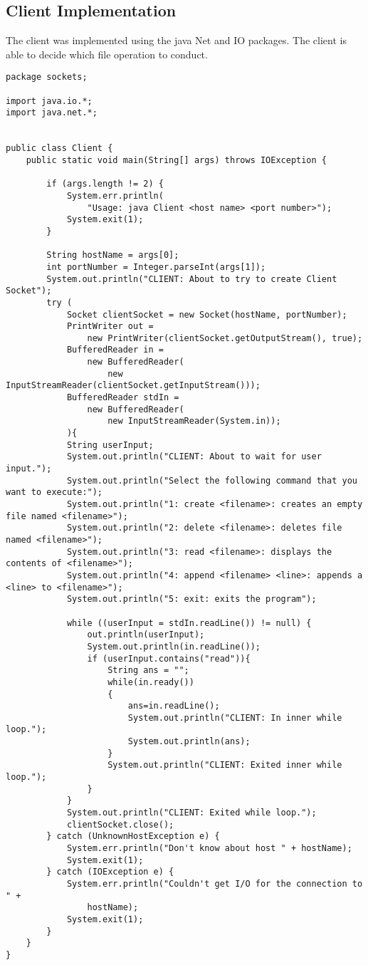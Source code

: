 \documentclass{article}
\begin{document}
	\subsection{Client Implementation}
	The client was implemented using the java Net and IO packages. The client is able to decide which file operation to conduct.
		\begin{lstlisting}
package sockets;

import java.io.*;
import java.net.*;


public class Client {
	public static void main(String[] args) throws IOException {
        
        if (args.length != 2) {
            System.err.println(
                "Usage: java Client <host name> <port number>");
            System.exit(1);
        }
 
        String hostName = args[0];
        int portNumber = Integer.parseInt(args[1]);
        System.out.println("CLIENT: About to try to create Client Socket");
        try (
            Socket clientSocket = new Socket(hostName, portNumber);
        	PrintWriter out =
                new PrintWriter(clientSocket.getOutputStream(), true);
        	BufferedReader in =
                new BufferedReader(
                    new InputStreamReader(clientSocket.getInputStream()));
            BufferedReader stdIn =
                new BufferedReader(
                    new InputStreamReader(System.in));
        	){
        	String userInput;
        	System.out.println("CLIENT: About to wait for user input.");
        	System.out.println("Select the following command that you want to execute:");
    		System.out.println("1: create <filename>: creates an empty file named <filename>");
    		System.out.println("2: delete <filename>: deletes file named <filename>");
    		System.out.println("3: read <filename>: displays the contents of <filename>");
    		System.out.println("4: append <filename> <line>: appends a <line> to <filename>");
    		System.out.println("5: exit: exits the program");
            
    		while ((userInput = stdIn.readLine()) != null) {
    			out.println(userInput);
    			System.out.println(in.readLine());
    			if (userInput.contains("read")){
    				String ans = "";
    				while(in.ready())
                    {
    					ans=in.readLine();
                    	System.out.println("CLIENT: In inner while loop.");
                    	System.out.println(ans);
                    }
                    System.out.println("CLIENT: Exited inner while loop.");
    			}
    		}
            System.out.println("CLIENT: Exited while loop.");
            clientSocket.close();
        } catch (UnknownHostException e) {
            System.err.println("Don't know about host " + hostName);
            System.exit(1);
        } catch (IOException e) {
            System.err.println("Couldn't get I/O for the connection to " +
                hostName);
            System.exit(1);
        } 
    }
}
		\end{lstlisting}
\end{document}
